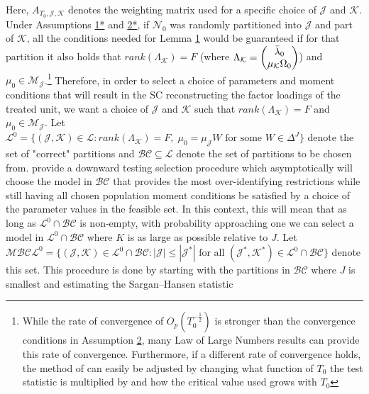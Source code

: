 \documentclass{article}
\begin{document}
Here, $A_{T_0,\mathcal{J},\mathcal{K}}$ denotes the weighting matrix used for a specific choice of $\mathcal{J}$ and $\mathcal{K}$. Under Assumptions \hyperref[A1*]{1*} and \hyperref[A2*]{2*}, if $\mathcal{N}_0$ was randomly partitioned into $\mathcal{J}$ and part of $\mathcal{K}$, all the conditions needed for Lemma \hyperref[L1]{1} would be guaranteed if for that partition it also holds that $rank(\Lambda_{\mathcal{K}}) = F$ (where $\Lambda_{\mathcal{K}} = \begin{pmatrix}
    \Bar{\lambda}_0 \\
    \mu_{\mathcal{K}}\Omega_0
\end{pmatrix}$) and $\mu_0 \in \mathcal{M}_{\mathcal{J}}$.\footnote{
While the rate of convergence of $O_p(T_0^{-\frac{1}{2}})$ is stronger than the convergence conditions in Assumption \hyperref[A2]{2}, many Law of Large Numbers results can provide this rate of convergence. Furthermore, if a different rate of convergence holds, the method of \cite{MomentSelection} can easily be adjusted by changing what function of $T_0$ the test statistic is multiplied by and how the critical value used grows with $T_0$} Therefore, in order to select a choice of parameters and moment conditions that will result in the SC reconstructing the factor loadings of the treated unit, we want a choice of $\mathcal{J}$ and $\mathcal{K}$ such that $rank(\Lambda_{\mathcal{K}}) = F$ and $\mu_0 \in \mathcal{M}_{\mathcal{J}}$. Let $\mathcal{L}^0 = \{ (\mathcal{J},\mathcal{K}) \in \mathcal{L} : rank(\Lambda_{\mathcal{K}}) = F,\; \mu_0 = \mu_{\mathcal{J}} W \text{ for some } W \in \Delta^J \}$ denote the set of "correct" partitions and $\mathcal{B}\mathcal{C} \subseteq \mathcal{L}$ denote the set of partitions to be chosen from. \cite{MomentSelection} provide a downward testing selection procedure which asymptotically will choose the model in $\mathcal{BC}$ that provides the most over-identifying restrictions while still having all chosen population moment conditions be satisfied by a choice of the parameter values in the feasible set. In this context, this will mean that as long as $\mathcal{L}^0 \cap \mathcal{BC}$ is non-empty, with probability approaching one we can select a model in $\mathcal{L}^0 \cap \mathcal{BC}$ where $K$ is as large as possible relative to $J$. Let $\mathcal{MBCL}^0 = \{ (\mathcal{J},\mathcal{K}) \in \mathcal{L}^0\cap \mathcal{BC} : |\mathcal{J}| \leq |\mathcal{J}^*| \text{ for all } (\mathcal{J}^*,\mathcal{K}^*) \in \mathcal{L}^0\cap \mathcal{BC}\}$ denote this set. This procedure is done by starting with the partitions in $\mathcal{BC}$ where $J$ is smallest and estimating the Sargan–Hansen statistic
\end{document}

